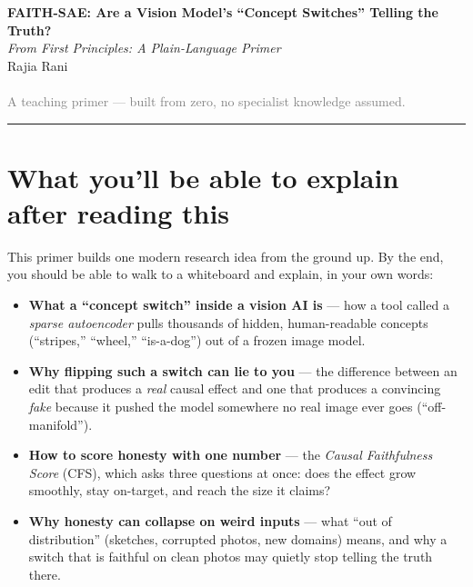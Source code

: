 \documentclass[12pt]{article}
\begin{document}
\begin{center}
{\LARGE\bfseries\color{accent} FAITH-SAE: Are a Vision Model's ``Concept Switches'' Telling the Truth?}\\[0.35em]
{\large\itshape From First Principles: A Plain-Language Primer}\\[0.9em]
{\large Rajia Rani}\\[0.2em]
{\small\textcolor{graytext}{}}\\[0.3em]
{\small\textcolor{graytext}{A teaching primer --- built from zero, no specialist knowledge assumed.}}
\end{center}

\vspace{0.4em}
\hrule
\vspace{1.0em}

\section{What you'll be able to explain after reading this}

This primer builds one modern research idea from the ground up. By the end, you should be able to walk to a whiteboard and explain, in your own words:

\begin{itemize}[leftmargin=1.4em, itemsep=2pt]
  \item \textbf{What a ``concept switch'' inside a vision AI is} --- how a tool called a \emph{sparse autoencoder} pulls thousands of hidden, human-readable concepts (``stripes,'' ``wheel,'' ``is-a-dog'') out of a frozen image model.
  \item \textbf{Why flipping such a switch can lie to you} --- the difference between an edit that produces a \emph{real} causal effect and one that produces a convincing \emph{fake} because it pushed the model somewhere no real image ever goes (``off-manifold'').
  \item \textbf{How to score honesty with one number} --- the \emph{Causal Faithfulness Score} (CFS), which asks three questions at once: does the effect grow smoothly, stay on-target, and reach the size it claims?
  \item \textbf{Why honesty can collapse on weird inputs} --- what ``out of distribution'' (sketches, corrupted photos, new domains) means, and why a switch that is faithful on clean photos may quietly stop telling the truth there.
\end{itemize}
\end{document}
